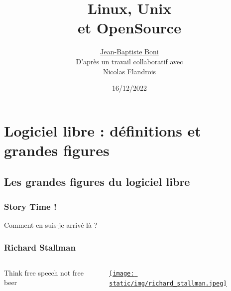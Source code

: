 \documentclass{beamer}
\title{Linux, Unix\\ et OpenSource}
\date{16/12/2022}
\author[JB Boni]{\href{https://github.com/Odonon}{Jean-Baptiste Boni}\\D'après un travail collaboratif avec\\ \href{https://github.com/NicolasFlandrois}{Nicolas Flandrois}}
\begin{document}
\begin{frame}[plain]
\titlepage
\end{frame}




\section[Logiciel libre]{Logiciel libre : définitions et grandes figures}

\subsection{Les grandes figures du logiciel libre}
\begin{frame} 
\frametitle{Story Time !} 

\begin{center}
	Comment en suis-je arrivé là ?

\end{center}

\end{frame}

\begin{frame}
	\frametitle{Richard Stallman}
	
\begin{columns}
	\begin{column}{.5\textwidth}
		Think free speech not free beer
	\end{column}
	
	
	\begin{column}{.5\textwidth}
		\href{https://fr.wikipedia.org/wiki/Richard_Stallman}{\texttt{[image: static/img/richard\_stallman.jpeg]}}
	\end{column}
\end{columns}
\end{frame}
\end{document}
